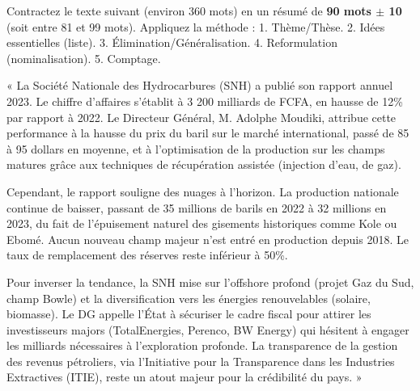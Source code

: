 \documentclass[11pt]{article}
\begin{document}
\begin{exercice}
Contractez le texte suivant (environ 360 mots) en un résumé de \textbf{90 mots $\pm$ 10} (soit entre 81 et 99 mots). Appliquez la méthode : 1. Thème/Thèse. 2. Idées essentielles (liste). 3. Élimination/Généralisation. 4. Reformulation (nominalisation). 5. Comptage.

\begin{itshape}« La Société Nationale des Hydrocarbures (SNH) a publié son rapport annuel 2023. Le chiffre d'affaires s'établit à 3 200 milliards de FCFA, en hausse de 12\% par rapport à 2022. Le Directeur Général, M. Adolphe Moudiki, attribue cette performance à la hausse du prix du baril sur le marché international, passé de 85 à 95 dollars en moyenne, et à l'optimisation de la production sur les champs matures grâce aux techniques de récupération assistée (injection d'eau, de gaz). 

Cependant, le rapport souligne des nuages à l'horizon. La production nationale continue de baisser, passant de 35 millions de barils en 2022 à 32 millions en 2023, du fait de l'épuisement naturel des gisements historiques comme Kole ou Ebomé. Aucun nouveau champ majeur n'est entré en production depuis 2018. Le taux de remplacement des réserves reste inférieur à 50\%. 

Pour inverser la tendance, la SNH mise sur l'offshore profond (projet Gaz du Sud, champ Bowle) et la diversification vers les énergies renouvelables (solaire, biomasse). Le DG appelle l'État à sécuriser le cadre fiscal pour attirer les investisseurs majors (TotalEnergies, Perenco, BW Energy) qui hésitent à engager les milliards nécessaires à l'exploration profonde. La transparence de la gestion des revenus pétroliers, via l'Initiative pour la Transparence dans les Industries Extractives (ITIE), reste un atout majeur pour la crédibilité du pays. »\end{itshape}
\end{exercice}
\end{document}
